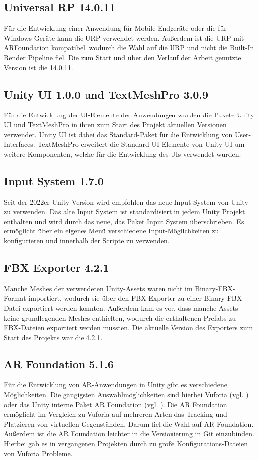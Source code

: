 \subsection{Universal RP 14.0.11}
Für die Entwicklung einer Anwendung für Mobile Endgeräte oder die für Windows-Geräte kann die \ac{URP} verwendet werden. Außerdem ist die \ac{URP} mit ARFoundation kompatibel, wodurch die Wahl auf die \ac{URP} und nicht die Built-In Render Pipeline fiel. Die zum Start und über den Verlauf der Arbeit genutzte Version ist die 14.0.11.

\subsection{Unity UI 1.0.0 und TextMeshPro 3.0.9}
Für die Entwicklung der \ac{UI}-Elemente der Anwendungen wurden die Pakete Unity \ac{UI} und TextMeshPro in ihren zum Start des Projekt aktuellen Versionen verwendet. Unity \ac{UI} ist dabei das Standard-Paket für die Entwicklung von User-Interfaces. TextMeshPro erweitert die Standard \ac{UI}-Elemente von Unity \ac{UI} um weitere Komponenten, welche für die Entwicklung des \ac{UI}s verwendet wurden.

\subsection{Input System 1.7.0}
Seit der 2022er-Unity Version wird empfohlen das neue Input System von Unity zu verwenden. Das alte Input System ist standardisiert in jedem Unity Projekt enthalten und wird durch das neue, das Paket Input System überschrieben. Es ermöglicht über ein eigenes Menü verschiedene Input-Möglichkeiten zu konfigurieren und innerhalb der Scripte zu verwenden.

\subsection{FBX Exporter 4.2.1}
Manche Meshes der verwendeten Unity-Assets waren nicht im Binary-\ac{FBX}-Format importiert,  wodurch sie über den \ac{FBX} Exporter zu einer Binary-\ac{FBX} Datei exportiert werden konnten. Außerdem kam es vor, dass manche Assets keine grundlegenden Meshes enthielten, wodurch die enthaltenen Prefabs zu \ac{FBX}-Dateien exportiert werden mussten. Die aktuelle Version des Exporters zum Start des Projekts war die 4.2.1.

\subsection{AR Foundation 5.1.6}
Für die Entwicklung von \ac{AR}-Anwendungen in Unity gibt es verschiedene Möglichkeiten. Die gängigsten Auswahlmöglichkeiten sind hierbei Vuforia (vgl. \cite{noauthor_home_nodate}) oder das Unity interne Paket AR Foundation (vgl. \cite{noauthor_ar_nodate}). Die AR Foundation ermöglicht im Vergleich zu Vuforia auf mehreren Arten das Tracking und Platzieren von virtuellen Gegenständen. Darum fiel die Wahl auf AR Foundation. Außerdem ist die AR Foundation leichter in die Versionierung in Git einzubinden. Hierbei gab es in vergangenen Projekten durch zu große Konfigurations-Dateien von Vuforia Probleme.

